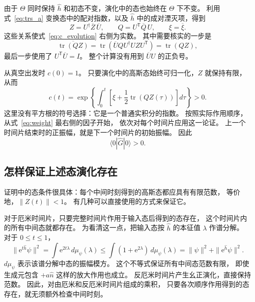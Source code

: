 \documentclass[UTF8,11pt,a4paper,fontset=fandol]{ctexart}
\newcommand{\tr}{\operatorname{tr}}
\newcommand{\ee}{\mathrm e}
\newcommand{\trans}{\mathsf T}
\numberwithin{equation}{section}
\begin{document}
由于 $\Theta$ 同时保持 $\hat h$ 和初态不变，演化中的态也始终在 $\Theta$ 下不变。
利用式~\eqref{eq:trs_a} 变换态中的配对指数，以及 $\hat h$ 中的成对湮灭项，得到
\begin{equation}
 Z=U^\dagger\overline Z\,\overline U,
 \qquad Q=U^\trans\overline Q\,U,
 \qquad \xi=\overline\xi.
 \label{eq:qz_reality}
\end{equation}
这些关系使式~\eqref{eq:c_evolution} 右侧为实数。
其中需要核实的一步是
\begin{equation}
 \overline{\tr(QZ)}
 =\tr\!\left(\overline U Q U^\dagger UZ U^\trans\right)
 =\tr(QZ),
 \label{eq:trace_qz_real}
\end{equation}
最后一步使用了 $U^\trans\overline U=I$。
整个计算没有用到 $\overline U U$ 的正负号。

从真空出发时 $c(0)=1$。
只要演化中的高斯态始终可归一化，$Z$ 就保持有限，从而
\begin{equation}
 c(t)=\exp\!\left\{\int_0^t
 \left[\xi+\frac12\tr(QZ(\tau))\right]d\tau\right\}>0.
 \label{eq:c_positive}
\end{equation}
这里没有平方根的符号选择：它是一个普通实积分的指数。
按照实际作用顺序，从式~\eqref{eq:weight} 最右侧的因子开始，
依次对每个时间片应用这一论证。
上一个时间片结束时的正振幅，就是下一个时间片的初始振幅。
因此
\begin{equation}
 \langle0|\hat G|0\rangle>0.
 \label{eq:vacuum_positive}
\end{equation}

\subsection{怎样保证上述态演化存在}
\label{sec:existence}

证明中的态条件很具体：每个中间时刻得到的高斯态都应具有有限范数，
等价地，$\|Z(t)\|<1$。
有几种可以直接使用的方式来保证它。

对于厄米时间片，只要完整时间片作用于输入态后得到的态存在，
这个时间片内的所有中间态就都存在。
为看清这一点，把输入态按 $\hat h$ 的本征值 $\lambda$ 作谱分解。
对于 $0\leq t\leq1$，
\begin{equation}
 \|\ee^{t\hat h}\psi\|^2
 =\int\ee^{2t\lambda}\,d\mu_\psi(\lambda)
 \leq\int(1+\ee^{2\lambda})\,d\mu_\psi(\lambda)
 =\|\psi\|^2+\|\ee^{\hat h}\psi\|^2.
 \label{eq:hermitian_slice}
\end{equation}
$d\mu_\psi$ 表示该谱分解中态的振幅模方。
这个不等式保证所有中间态范数有限，
即使生成元包含 $+a\hat n$ 这样的放大作用也成立。
反厄米时间片产生幺正演化，直接保持范数。
因此，对由厄米和反厄米时间片组成的乘积，
只要各次顺序作用得到的态存在，就无须额外检查中间时刻。
\end{document}
